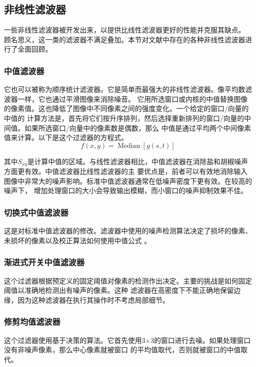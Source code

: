 \documentclass[12pt]{article} %
\begin{document}
\subsection{非线性滤波器}
一些非线性滤波器\cite{ref2,ref3,ref4,ref7,ref10,ref11,ref12,ref16,ref18,ref19,ref20,ref29,ref31}被开发出来，以提供比线性滤波器更好的性能并克服其缺点。
顾名思义，这一类的滤波器不满足叠加。本节对文献中存在的各种非线性滤波器进行了全面回顾。

\subsubsection{中值滤波器}
它也可以被称为顺序统计滤波器。它是简单而最强大的非线性滤波器。像平均数滤波器一样，它也通过平滑图像来消除噪音。
它用所选窗口或内核的中值替换图像的像素值。这也降低了图像中不同像素之间的强度变化。一个给定的窗口/向量的中值的
计算方法是，首先将它们按升序排列，然后选择重新排列的窗口/向量的中间值。如果所选窗口/向量中的像素数是偶数，那么
中值是通过平均两个中间像素值来计算。以下是这个过滤器的方程式。
\begin{equation}
    f(x, y)=\operatorname{Median}[g(s, t)]
\end{equation}

其中$S_{xy}$是计算中值的区域。与线性滤波器相比，中值滤波器在消除盐和胡椒噪声方面更有效。中值滤波器比线性滤波器的主
要优点是，前者可以有效地消除输入图像中非常大的噪声影响。标准中值滤波器通常在低噪声密度下更有效。在较高的噪声下，
增加处理窗口的大小会导致输出模糊，而小窗口的噪声抑制效果不佳。

\subsubsection{切换式中值滤波器}
这是对标准中值滤波器的修改。滤波器中使用的噪声检测算法决定了损坏的像素、未损坏的像素以及校正算法如何使用中值公式
\cite{ref12,ref20,ref29,ref31}。

\subsubsection{渐进式开关中值滤波器}
这个过滤器根据预定义的固定阈值对像素的检测作出决定。主要的挑战是如何固定阈值以准确地检测出有噪声的像素。这种
滤波器在高密度下不能正确地保留边缘，因为这种滤波器在执行其操作时不考虑局部细节\cite{ref12,ref20,ref29,ref31}。

\subsubsection{修剪均值滤波器}
这个过滤器使用基于决策的算法。它首先使用3×3的窗口进行去噪。如果处理窗口没有非噪声像素，那么中心像素就被窗口
的平均值取代，否则就被窗口的中值取代\cite{ref3}。
\end{document}
